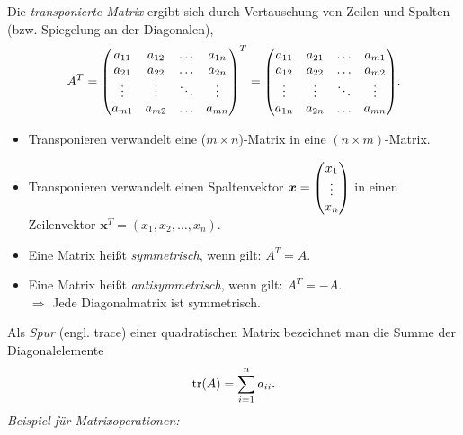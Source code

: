 Die \emph{transponierte Matrix} ergibt sich durch Vertauschung von Zeilen und Spalten (bzw. Spiegelung an der Diagonalen), 
\begin{align}
    A^T = \mqty(a_{11} & a_{12} & \hdots & a_{1n} \\
    a_{21} & a_{22} & \hdots & a_{2n} \\
    \vdots & \vdots & \ddots & \vdots \\
    a_{m1} & a_{m2} & \hdots & a_{mn})^T = \mqty(a_{11} & a_{21} & \hdots & a_{m1} \\
    a_{12} & a_{22} & \hdots & a_{m2} \\
    \vdots & \vdots & \ddots & \vdots \\
    a_{1n} & a_{2n} & \hdots & a_{mn}).
\end{align}
\begin{itemize}
    \item Transponieren verwandelt eine ($m\times n$)-Matrix in eine  $(n\times m)$-Matrix.
    \item Transponieren verwandelt einen Spaltenvektor $\bm{x} = \mqty(x_1 \\ \vdots \\ x_n)$ in einen Zeilenvektor $\bm{x}^T = (x_1,x_2,\hdots, x_n)$. 
    \item Eine Matrix heißt \emph{symmetrisch}, wenn gilt: $A^T = A$.
    \item Eine Matrix heißt \emph{antisymmetrisch}, wenn gilt: $A^T = -A$.\\
    $\Rightarrow $ Jede Diagonalmatrix ist symmetrisch.
\end{itemize}
Als \emph{Spur} (engl. trace) einer quadratischen Matrix bezeichnet man die Summe der Diagonalelemente 
\begin{align}
    \trace(A) = \sum_{i=1}^n a_{ii}.
\end{align}
\emph{Beispiel für Matrixoperationen:}
